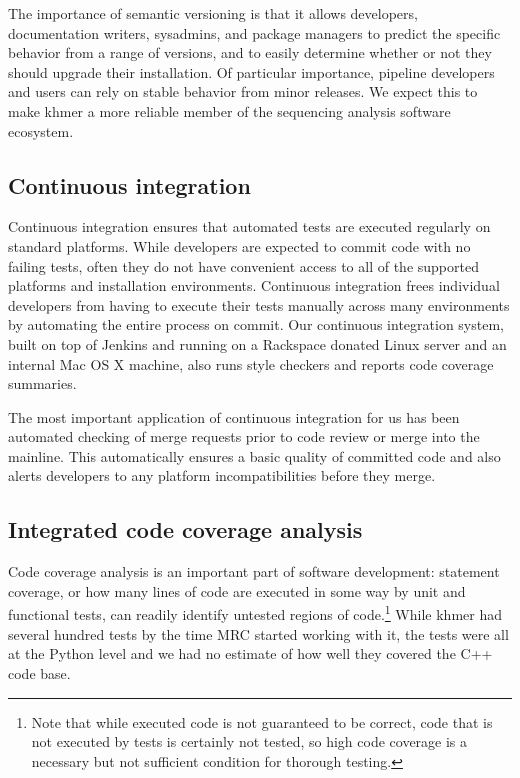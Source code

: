 \documentclass[12pt]{article}
\begin{document}
The importance of semantic versioning is that it allows developers,
documentation writers, sysadmins, and package managers to predict the
specific behavior from a range of versions, and to easily determine
whether or not they should upgrade their installation.  Of particular
importance, pipeline developers and users can rely on stable behavior
from minor releases.  We expect this to make khmer a more reliable
member of the sequencing analysis software ecosystem.

\subsection{Continuous integration}

Continuous integration ensures that automated tests are executed
regularly on standard platforms.  While developers are expected to
commit code with no failing tests, often they do not have convenient
access to all of the supported platforms and installation
environments.  Continuous integration frees individual developers from
having to execute their tests manually across many environments by
automating the entire process on commit.  Our continuous integration
system, built on top of Jenkins and running on a Rackspace donated
Linux server and an internal Mac OS X machine, also runs style
checkers and reports code coverage summaries.

The most important application of continuous integration for us has
been automated checking of merge requests prior to code review or
merge into the mainline.  This automatically ensures a basic quality
of committed code and also alerts developers to any platform
incompatibilities before they merge.


\subsection{Integrated code coverage analysis}

Code coverage analysis is an important part of software development:
statement coverage, or how many lines of code are executed in some way
by unit and functional tests, can readily identify untested regions of
code.\footnote{Note that while executed code is not guaranteed to be
  correct, code that is not executed by tests is certainly not tested,
  so high code coverage is a necessary but not sufficient condition
  for thorough testing.}  While khmer had several hundred tests by the
time MRC started working with it, the tests were all at the Python
level and we had no estimate of how well they covered the C++ code
base.
\end{document}
